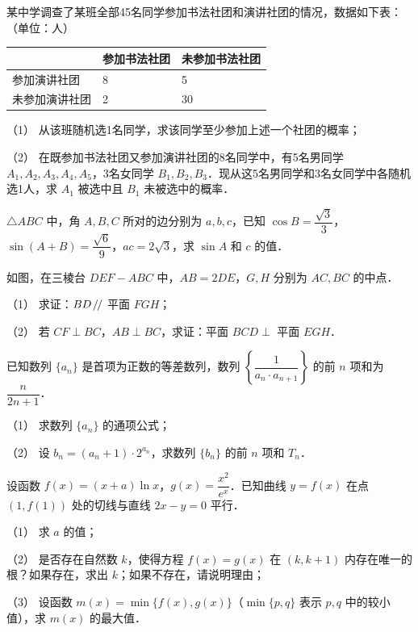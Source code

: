 \begin{question}
某中学调查了某班全部45名同学参加书法社团和演讲社团的情况，数据如下表：（单位：人）

\begin{center}
\begin{tabular}{lll}
\toprule
 & 参加书法社团 & 未参加书法社团 \\
\midrule
参加演讲社团 & 8 & 5 \\
未参加演讲社团 & 2 & 30 \\
\bottomrule
\end{tabular}
\end{center}

（1） 从该班随机选1名同学，求该同学至少参加上述一个社团的概率；

（2） 在既参加书法社团又参加演讲社团的8名同学中，有5名男同学 \(A_1,A_2,A_3,A_4,A_5\)，3名女同学 \(B_1,B_2,B_3\)．现从这5名男同学和3名女同学中各随机选1人，求 \(A_1\) 被选中且 \(B_1\) 未被选中的概率．

\end{question}
\begin{question}
\(\triangle ABC\) 中，角 \(A,B,C\) 所对的边分别为 \(a,b,c\)，已知 \(\cos B=\dfrac{\sqrt3}{3}\)，\(\sin(A+B)=\dfrac{\sqrt6}{9}\)，\(ac=2\sqrt3\)，求 \(\sin A\) 和 \(c\) 的值．

\Needspace{0.4\textheight}
\end{question}
\begin{question}
如图，在三棱台 \(DEF-ABC\) 中，\(AB=2DE\)，\(G,H\) 分别为 \(AC,BC\) 的中点．
\nopagebreak[4]
\begin{center}\end{center}
\nopagebreak[4]
（1） 求证：\(BD\mathrel{\mkern-3mu/\mkern-2mu/}\) 平面 \(FGH\)；

（2） 若 \(CF\perp BC\)，\(AB\perp BC\)，求证：平面 \(BCD\perp\) 平面 \(EGH\)．

\end{question}
\begin{question}
已知数列 \(\{a_n\}\) 是首项为正数的等差数列，数列 \(\left\{\dfrac1{a_n\cdot a_{n+1}}\right\}\) 的前 \(n\) 项和为 \(\dfrac{n}{2n+1}\)．

（1） 求数列 \(\{a_n\}\) 的通项公式；

（2） 设 \(b_n=(a_n+1)\cdot2^{a_n}\)，求数列 \(\{b_n\}\) 的前 \(n\) 项和 \(T_n\)．

\end{question}
\begin{question}
设函数 \(f(x)=(x+a)\ln x\)，\(g(x)=\dfrac{x^2}{e^x}\)．已知曲线 \(y=f(x)\) 在点 \((1,f(1))\) 处的切线与直线 \(2x-y=0\) 平行．

（1） 求 \(a\) 的值；

（2） 是否存在自然数 \(k\)，使得方程 \(f(x)=g(x)\) 在 \((k,k+1)\) 内存在唯一的根？如果存在，求出 \(k\)；如果不存在，请说明理由；

（3） 设函数 \(m(x)=\min\{f(x),g(x)\}\)（\(\min\{p,q\}\) 表示 \(p,q\) 中的较小值），求 \(m(x)\) 的最大值．

\end{question}
